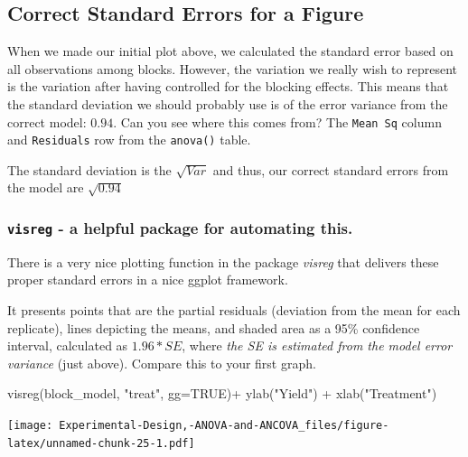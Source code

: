 \documentclass[
]{book}
\newenvironment{Shaded}{\begin{snugshade}}{\end{snugshade}}
\newcommand{\AttributeTok}[1]{\textcolor[rgb]{0.77,0.63,0.00}{#1}}
\newcommand{\ConstantTok}[1]{\textcolor[rgb]{0.00,0.00,0.00}{#1}}
\newcommand{\FunctionTok}[1]{\textcolor[rgb]{0.00,0.00,0.00}{#1}}
\newcommand{\NormalTok}[1]{#1}
\newcommand{\SpecialCharTok}[1]{\textcolor[rgb]{0.00,0.00,0.00}{#1}}
\newcommand{\StringTok}[1]{\textcolor[rgb]{0.31,0.60,0.02}{#1}}
\begin{document}
\hypertarget{correct-standard-errors-for-a-figure}{%
\subsection{Correct Standard Errors for a Figure}\label{correct-standard-errors-for-a-figure}}

When we made our initial plot above, we calculated the standard error based on all observations among blocks. However, the variation we really wish to represent is the variation after having controlled for the blocking effects. This means that the standard deviation we should probably use is of the error variance from the correct model: \(0.94\). Can you see where this comes from? The \texttt{Mean\ Sq} column and \texttt{Residuals} row from the \texttt{anova()} table.

The standard deviation is the \(\sqrt{Var}\) and thus, our correct standard errors from the model are \(\sqrt{0.94}\)

\hypertarget{visreg---a-helpful-package-for-automating-this.}{%
\subsubsection{\texorpdfstring{\texttt{visreg} - a helpful package for automating this.}{visreg - a helpful package for automating this.}}\label{visreg---a-helpful-package-for-automating-this.}}

There is a very nice plotting function in the package \emph{visreg} that delivers these proper standard errors in a nice ggplot framework.

It presents points that are the partial residuals (deviation from the mean for each replicate), lines depicting the means, and shaded area as a 95\% confidence interval, calculated as \(1.96*SE\), where \emph{the SE is estimated from the model error variance} (just above). Compare this to your first graph.

\begin{Shaded}
\begin{Highlighting}[]
\FunctionTok{visreg}\NormalTok{(block\_model, }\StringTok{"treat"}\NormalTok{, }\AttributeTok{gg=}\ConstantTok{TRUE}\NormalTok{)}\SpecialCharTok{+}
  \FunctionTok{ylab}\NormalTok{(}\StringTok{"Yield"}\NormalTok{) }\SpecialCharTok{+} 
  \FunctionTok{xlab}\NormalTok{(}\StringTok{"Treatment"}\NormalTok{) }
\end{Highlighting}
\end{Shaded}

\texttt{[image: Experimental-Design,-ANOVA-and-ANCOVA\_files/figure-latex/unnamed-chunk-25-1.pdf]}
\end{document}
